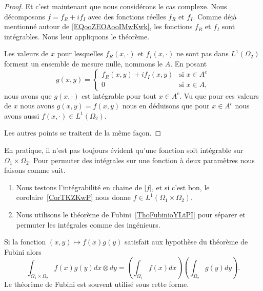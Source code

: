 \begin{proof}
	Et c'est maintenant que nous considérons le cas complexe. Nous décomposons \( f=f_R+if_I\) avec des fonctions réelles \( f_R\) et \( f_I\). Comme déjà mentionné autour de \eqref{EQooZEOAooIMwKwk}, les fonctions \( f_R\) et \( f_I\) sont intégrables. Nous leur appliquons le théorème.

	Les valeurs de \( x\) pour lesquelles \( f_R(x,\cdot)\) et \( f_I(x,\cdot)\) ne sont pas dans \( L^1(\Omega_2)\) forment un ensemble de mesure nulle, nommons le \( A\). En posant
	\begin{equation}
		g(x,y)=\begin{cases}
			f_R(x,y)+if_I(x,y) & \text{si } x\in A^c \\
			0                  & \text{si } x\in A,
		\end{cases}
	\end{equation}
	nous avons que \( g(x,\cdot)\) est intégrable pour tout \( x\in A^c\). Vu que pour ces valeurs de \( x\) nous avons \( g(x,y)=f(x,y)\) nous en déduisons que pour \( x\in A^c\) nous avons aussi \( f(x,\cdot)\in L^1(\Omega_2)\).

	Les autres points se traitent de la même façon.
\end{proof}

\begin{normaltext}      \label{NORMooKIRJooPvyPWQ}
	En pratique, il n'est pas toujours évident qu'une fonction soit intégrable sur \( \Omega_1\times \Omega_2\). Pour permuter des intégrales sur une fonction à deux paramètres nous faisons comme suit.
	\begin{enumerate}
		\item
		      Nous testons l'intégrabilité en chaine de \( | f |\), et si c'est bon, le corolaire~\ref{CorTKZKwP} nous donne \( f\in L^1(\Omega_1\times \Omega_2)\).
		\item
		      Nous utilisons le théorème de Fubini~\ref{ThoFubinioYLtPI} pour séparer et permuter les intégrales comme des ingénieurs.
	\end{enumerate}

	Si la fonction \( (x,y)\mapsto f(x)g(y)\) satisfait aux hypothèse du théorème de Fubini alors
	\begin{equation}    \label{EqTJEEsJW}
		\int_{\Omega_1\times \Omega_2} f(x)g(y)dx\otimes dy=\left( \int_{\Omega_1}f(x)dx \right)\left( \int_{\Omega_2}g(y)dy \right).
	\end{equation}
	Le théorème de Fubini est souvent utilisé sous cette forme.

\end{normaltext}

